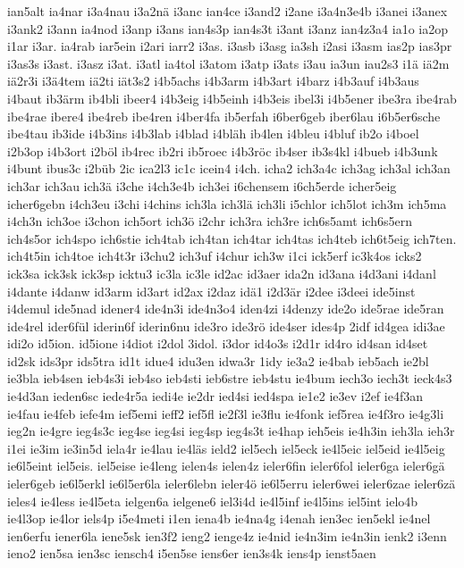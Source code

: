 {ian5alt
ia4nar
i3a4nau
i3a2nä
i3anc
ian4ce
i3and2
i2ane
i3a4n3e4b
i3anei
i3anex
i3ank2
i3ann
ia4nod
i3anp
i3ans
ian4s3p
ian4s3t
i3ant
i3anz
ian4z3a4
ia1o
ia2op
i1ar
i3ar.
ia4rab
iar5ein
i2ari
iarr2
i3as.
i3asb
i3asg
ia3sh
i2asi
i3asm
ias2p
ias3pr
i3as3s
i3ast.
i3asz
i3at.
i3atl
ia4tol
i3atom
i3atp
i3ats
i3au
ia3un
iau2s3
i1ä
iä2m
iä2r3i
i3ä4tem
iä2ti
iät3s2
i4b5achs
i4b3arm
i4b3art
i4barz
i4b3auf
i4b3aus
i4baut
ib3ärm
ib4bli
ibeer4
i4b3eig
i4b5einh
i4b3eis
ibel3i
i4b5ener
ibe3ra
ibe4rab
ibe4rae
ibere4
ibe4reb
ibe4ren
i4ber4fa
ib5erfah
i6ber6geb
iber6lau
i6b5er6sche
ibe4tau
ib3ide
i4b3ins
i4b3lab
i4blad
i4bläh
ib4len
i4bleu
i4bluf
ib2o
i4boel
i2b3op
i4b3ort
i2böl
ib4rec
ib2ri
ib5roec
i4b3röc
ib4ser
ib3s4kl
i4bueb
i4b3unk
i4bunt
ibus3c
i2büb
2ic
ica2l3
ic1c
icein4
i4ch.
icha2
ich3a4c
ich3ag
ich3al
ich3an
ich3ar
ich3au
ich3ä
i3che
i4ch3e4b
ich3ei
i6chensem
i6ch5erde
icher5eig
icher6gebn
i4ch3eu
i3chi
i4chins
ich3la
ich3lä
ich3li
i5chlor
ich5lot
ich3m
ich5ma
i4ch3n
ich3oe
i3chon
ich5ort
ich3ö
i2chr
ich3ra
ich3re
ich6s5amt
ich6s5ern
ich4s5or
ich4spo
ich6stie
ich4tab
ich4tan
ich4tar
ich4tas
ich4teb
ich6t5eig
ich7ten.
ich4t5in
ich4toe
ich4t3r
i3chu2
ich3uf
i4chur
ich3w
i1ci
ick5erf
ic3k4os
icks2
ick3sa
ick3sk
ick3sp
icktu3
ic3la
ic3le
id2ac
id3aer
ida2n
id3ana
i4d3ani
i4danl
i4dante
i4danw
id3arm
id3art
id2ax
i2daz
idä1
i2d3är
i2dee
i3deei
ide5inst
i4demul
ide5nad
idener4
ide4n3i
ide4n3o4
iden4zi
i4denzy
ide2o
ide5rae
ide5ran
ide4rel
ider6fül
iderin6f
iderin6nu
ide3ro
ide3rö
ide4ser
ides4p
2idf
id4gea
idi3ae
idi2o
id5ion.
id5ione
i4diot
i2dol
3idol.
i3dor
id4o3s
i2d1r
id4ro
id4san
id4set
id2sk
ids3pr
ids5tra
id1t
idue4
idu3en
idwa3r
1idy
ie3a2
ie4bab
ieb5ach
ie2bl
ie3bla
ieb4sen
ieb4s3i
ieb4so
ieb4sti
ieb6stre
ieb4stu
ie4bum
iech3o
iech3t
ieck4s3
ie4d3an
ieden6sc
iede4r5a
iedi4e
ie2dr
ied4si
ied4spa
ie1e2
ie3ev
i2ef
ie4f3an
ie4fau
ie4feb
iefe4m
ief5emi
ieff2
ief5fl
ie2f3l
ie3flu
ie4fonk
ief5rea
ie4f3ro
ie4g3li
ieg2n
ie4gre
ieg4s3c
ieg4se
ieg4si
ieg4sp
ieg4s3t
ie4hap
ieh5eis
ie4h3in
ieh3la
ieh3r
i1ei
ie3im
ie3in5d
iela4r
ie4lau
ie4läs
ield2
iel5ech
iel5eck
ie4l5eic
iel5eid
ie4l5eig
ie6l5eint
iel5eis.
iel5eise
ie4leng
ielen4s
ielen4z
ieler6fin
ieler6fol
ieler6ga
ieler6gä
ieler6geb
ie6l5erkl
ie6l5er6la
ieler6lebn
ieler4ö
ie6l5erru
ieler6wei
ieler6zae
ieler6zä
ieles4
ie4less
ie4l5eta
ielgen6a
ielgene6
iel3i4d
ie4l5inf
ie4l5ins
iel5int
ielo4b
ie4l3op
ie4lor
iels4p
i5e4meti
i1en
iena4b
ie4na4g
i4enah
ien3ec
ien5ekl
ie4nel
ien6erfu
iener6la
iene5sk
ien3f2
ieng2
ienge4z
ie4nid
ie4n3im
ie4n3in
ienk2
i3enn
ieno2
ien5sa
ien3sc
iensch4
i5en5se
iens6er
ien3s4k
iens4p
ienst5aen
}
